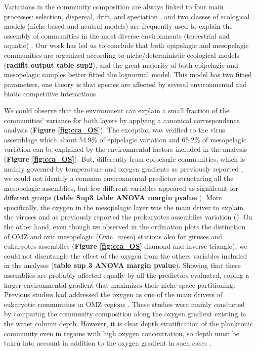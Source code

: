 \documentclass[fleqn,10pt]{wlscirep}
\begin{document}
Variations in the community composition are always linked to four main processes: selection, dispersal, drift, and speciation \cite{vellend_conceptual_2010}, and two classes of ecological models (niche-based and neutral models) are frequently used to explain the assembly of communities in the most diverse environments (terrestrial and aquatic) \cite{chave_neutral_2004, mcgill_empirical_2006}. Our work has led us to conclude that both epipelagic and mesopelagic communities are organized according to niche/deterministic ecological models (\textbf{radifit output table sup2}), and the great majority of both epipelagic and mesopelagic samples better fitted the lognormal model. This model has two fitted parameters, one theory is that species are affected by several environmental and biotic competitive interactions \cite{wilson_methods_1991}. 

We could observe that the environment can explain a small fraction of the communities’ variance for both layers by applying a canonical correspondence analysis (\textbf{Figure \ref{fig:cca_OS}}). The exception was verified to the virus assemblage which about 54.9\% of epipelagic variation and 65.2\% of mesopelagic variation can be explained by the environmental factors included in the analysis (\textbf{Figure \ref{fig:cca_OS}}). But, differently from epipelagic communities, which is mainly governed by temperature and oxygen gradients as previously reported \cite{sunagawa_structure_2015,gregory_marine_2019,ibarbalz_global_2019,giner_marked_2020, ghiglione_pole--pole_2012}, we could not identify a common environmental predictor structuring all the mesopelagic assemblies, but few different variables appeared as significant for different groups (\textbf{table Sup3 table ANOVA margin pvalue }). More specifically, the oxygen in the mesopelagic layer was the main driver to explain the viruses and as previously reported the prokaryotes assemblies variation (\cite{wright_microbial_2012, ulloa_pelagic_2013, aldunate_oxygen_2018}). On the other hand, even though we observed in the ordination plots the distinction of OMZ and oxic mesopelagic (Oxic\_meso) stations also for giruses and eukaryotes assemblies (\textbf{Figure \ref{fig:cca_OS}} diamond and inverse triangle), we could not disentangle the effect of the oxygen from the others variables included in the analyses (\textbf{table sup 3 ANOVA margin pvalue}). Showing that these assemblies are probably affected equally by all the predictors evaluated, coping a larger environmental gradient that maximizes their niche-space partitioning. Previous studies had addressed the oxygen as one of the main drivers of eukaryotic communities in OMZ regions \cite{de_la_iglesia_distinct_2020, orsi_effect_2012, parris_microbial_2014}. These studies were mainly conducted by comparing the community composition along the oxygen gradient existing in the water column depth. However, it is clear depth stratification of the planktonic community even in regions with high oxygen concentration, so depth must be taken into account in addition to the oxygen gradient in such cases \cite{schnetzer_depth_2011}.
\end{document}
